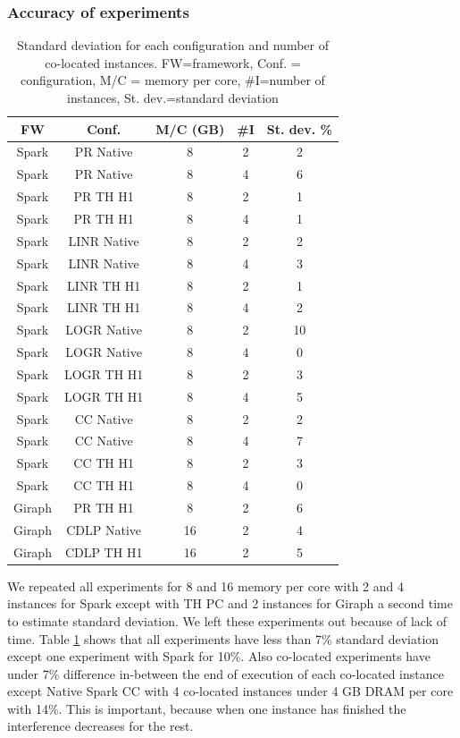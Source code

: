\subsubsection{Accuracy of experiments}

\begin{table}[thbp]
  \centering
  \caption{Standard deviation for each configuration and number of co-located instances.
        FW=framework, Conf. = configuration, M/C = memory per core, #I=number of instances, St. dev.=standard deviation}
  \label{tab:std-dev}
  \begin{tabular}{|c|c|c|c|c|}
    \hline
          \textbf{FW} & \textbf{Conf.} & \textbf{M/C (GB)} & \textbf{\#I} & \textbf{St. dev. \%} \\
    \hline
          Spark & PR Native & 8 & 2 & 2\\
          Spark & PR Native & 8 & 4 & 6\\
          Spark & PR TH H1 & 8 & 2 & 1 \\
          Spark & PR TH H1 & 8 & 4 & 1 \\
          Spark & LINR Native & 8 & 2 & 2 \\
          Spark & LINR Native & 8 & 4 & 3 \\
          Spark & LINR TH H1 & 8 & 2 & 1 \\
          Spark & LINR TH H1 & 8 & 4 & 2 \\
          Spark & LOGR Native & 8 & 2 & 10 \\
          Spark & LOGR Native & 8 & 4 & 0 \\
          Spark & LOGR TH H1 & 8 & 2 & 3 \\
          Spark & LOGR TH H1 & 8 & 4 & 5 \\
          Spark & CC Native & 8 & 2 & 2 \\
          Spark & CC Native & 8 & 4 & 7 \\
          Spark & CC TH H1 & 8 & 2 & 3 \\
          Spark & CC TH H1 & 8 & 4 & 0 \\
          Giraph & PR TH H1 & 8 & 2 & 6 \\
          Giraph & CDLP Native & 16 & 2 & 4 \\
          Giraph & CDLP TH H1 & 16 & 2 & 5 \\
    \hline
  \end{tabular}
\end{table}

We repeated all experiments for 8 and 16 memory per core with 2 and 4 instances for Spark except with TH PC and 2 instances for Giraph a second time to estimate standard deviation. We left these experiments out because of lack of time. Table \ref{tab:std-dev} shows that 
all experiments have less than 7\% standard deviation except one experiment with Spark for 10\%. Also co-located experiments have under 7\% difference in-between the end of execution of each co-located instance except Native Spark CC with 4 co-located instances under 4 GB DRAM per core with 14\%. This is important, because when one instance has finished the interference decreases for the rest.

